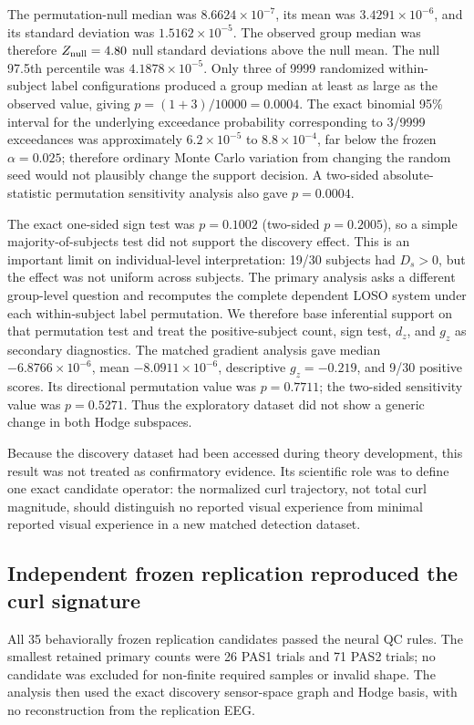 \documentclass[12pt]{article}
\begin{document}
The permutation-null median was $8.6624\times10^{-7}$, its mean was $3.4291\times10^{-6}$, and its standard deviation was $1.5162\times10^{-5}$. The observed group median was therefore $Z_{\rm null}=4.80$ null standard deviations above the null mean. The null 97.5th percentile was $4.1878\times10^{-5}$. Only three of 9999 randomized within-subject label configurations produced a group median at least as large as the observed value, giving $p=(1+3)/10000=0.0004$. The exact binomial 95\% interval for the underlying exceedance probability corresponding to 3/9999 exceedances was approximately $6.2\times10^{-5}$ to $8.8\times10^{-4}$, far below the frozen $\alpha=0.025$; therefore ordinary Monte Carlo variation from changing the random seed would not plausibly change the support decision. A two-sided absolute-statistic permutation sensitivity analysis also gave $p=0.0004$.

The exact one-sided sign test was $p=0.1002$ (two-sided $p=0.2005$), so a simple majority-of-subjects test did not support the discovery effect. This is an important limit on individual-level interpretation: 19/30 subjects had $D_s>0$, but the effect was not uniform across subjects. The primary analysis asks a different group-level question and recomputes the complete dependent LOSO system under each within-subject label permutation. We therefore base inferential support on that permutation test and treat the positive-subject count, sign test, $d_z$, and $g_z$ as secondary diagnostics. The matched gradient analysis gave median $-6.8766\times10^{-6}$, mean $-8.0911\times10^{-6}$, descriptive $g_z=-0.219$, and 9/30 positive scores. Its directional permutation value was $p=0.7711$; the two-sided sensitivity value was $p=0.5271$. Thus the exploratory dataset did not show a generic change in both Hodge subspaces.

Because the discovery dataset had been accessed during theory development, this result was not treated as confirmatory evidence. Its scientific role was to define one exact candidate operator: the normalized curl trajectory, not total curl magnitude, should distinguish no reported visual experience from minimal reported visual experience in a new matched detection dataset.

\subsection{Independent frozen replication reproduced the curl signature}
All 35 behaviorally frozen replication candidates passed the neural QC rules. The smallest retained primary counts were 26 PAS1 trials and 71 PAS2 trials; no candidate was excluded for non-finite required samples or invalid shape. The analysis then used the exact discovery sensor-space graph and Hodge basis, with no reconstruction from the replication EEG.
\end{document}
